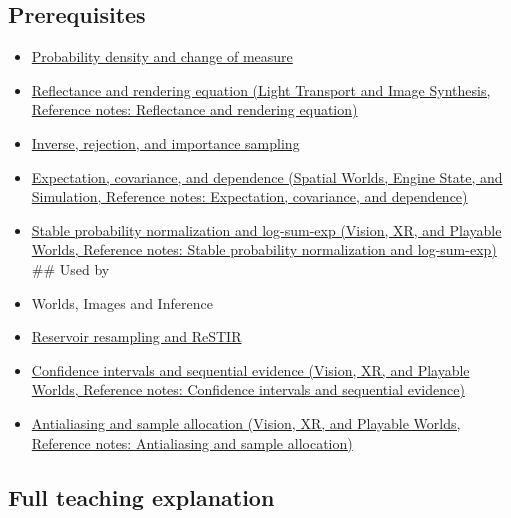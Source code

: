 \subsection{Prerequisites}\label{appendix-031e02bf28af-prerequisites}

\hypertarget{appendix-031e02bf28af-prerequisites}{}

\begin{itemize}
\item
  \hyperref[appendix-4815cd87ab8b]{Probability density and change of measure}
\item
  \href{../04-Light-Transport-and-Image-Synthesis/main.pdf\#nameddest=appendix-96da0b153b77}{Reflectance and rendering equation (Light Transport and Image Synthesis, Reference notes: Reflectance and rendering equation)}
\item
  \hyperref[appendix-8d863ed954d0]{Inverse, rejection, and importance sampling}
\item
  \href{../05-Spatial-Worlds-Engine-State-and-Simulation/main.pdf\#nameddest=appendix-54c383df9992}{Expectation, covariance, and dependence (Spatial Worlds, Engine State, and Simulation, Reference notes: Expectation, covariance, and dependence)}
\item
  \href{../07-Vision-XR-and-Playable-Worlds/main.pdf\#nameddest=appendix-d580b422240f}{Stable probability normalization and log-sum-exp (Vision, XR, and Playable Worlds, Reference notes: Stable probability normalization and log-sum-exp)} \#\# Used by
\item
  {Worlds, Images and Inference}
\item
  \hyperref[appendix-68be451b78b1]{Reservoir resampling and ReSTIR}
\item
  \href{../07-Vision-XR-and-Playable-Worlds/main.pdf\#nameddest=appendix-c83016554b1e}{Confidence intervals and sequential evidence (Vision, XR, and Playable Worlds, Reference notes: Confidence intervals and sequential evidence)}
\item
  \href{../07-Vision-XR-and-Playable-Worlds/main.pdf\#nameddest=appendix-4192b2bdd21e}{Antialiasing and sample allocation (Vision, XR, and Playable Worlds, Reference notes: Antialiasing and sample allocation)}
\end{itemize}

\subsection{Full teaching explanation}\label{appendix-031e02bf28af-full-teaching-explanation}

